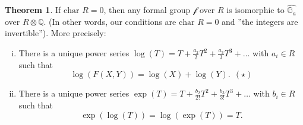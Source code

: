 \documentclass{article}
\theoremstyle{definition}
\newtheorem{theorem}{Theorem}[section]
\begin{document}
\begin{theorem}\label{theorem8.3}
    If $\text{char }R = 0$, then any formal group $\mathcal{f}$ over $R$ is isomorphic to $\widehat{\mathbb{G}_a}$ over $R \otimes \mathbb{Q}$. (In other words, our conditions are $\text{char }R = 0$ and ''the integers are invertible''). More precisely:
    \begin{enumerate}[(i)]
        \item There is a unique power series $\log(T) = T + \frac{a_2}{2}T^2 + \frac{a_3}{3}T^3 + \ldots$ with $a_i \in R$ such that 
        \[
        \log(F(X,Y)) = \log(X) + \log(Y).~~ (\star)
        \]
        \item There is a unique power series $\exp(T) = T + \frac{b_2}{2!}T^2 + \frac{b_3}{3!}T^3 + \ldots$ with $b_i \in R$ such that \[
        \exp(\log(T)) = \log(\exp(T)) = T.
        \]
    \end{enumerate}
\end{theorem}
\end{document}
